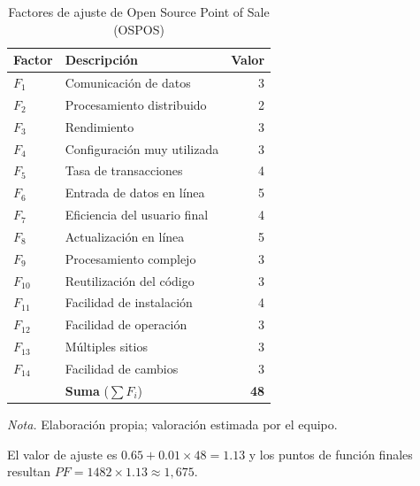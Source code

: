 \begin{table}[H]
\caption{Factores de ajuste de Open Source Point of Sale (OSPOS)}
\label{tab:ref3_fi}
\begin{threeparttable}
\begin{tabular}{>{\raggedright\arraybackslash}p{1.4cm} >{\raggedright\arraybackslash}p{7cm} r}
\toprule
Factor & Descripción & Valor \\
\midrule
$F_{1}$ & Comunicación de datos & 3 \\
$F_{2}$ & Procesamiento distribuido & 2 \\
$F_{3}$ & Rendimiento & 3 \\
$F_{4}$ & Configuración muy utilizada & 3 \\
$F_{5}$ & Tasa de transacciones & 4 \\
$F_{6}$ & Entrada de datos en línea & 5 \\
$F_{7}$ & Eficiencia del usuario final & 4 \\
$F_{8}$ & Actualización en línea & 5 \\
$F_{9}$ & Procesamiento complejo & 3 \\
$F_{10}$ & Reutilización del código & 3 \\
$F_{11}$ & Facilidad de instalación & 4 \\
$F_{12}$ & Facilidad de operación & 3 \\
$F_{13}$ & Múltiples sitios & 3 \\
$F_{14}$ & Facilidad de cambios & 3 \\
 & \textbf{Suma} ($\sum F_i$) & \textbf{48} \\
\bottomrule
\end{tabular}
\begin{tablenotes}
\item \textit{Nota.} Elaboración propia; valoración estimada por el equipo.
\end{tablenotes}
\end{threeparttable}
\end{table}

El valor de ajuste es $0.65 + 0.01 \times 48 = 1.13$ y los puntos de función finales resultan $PF = 1482 \times 1.13 \approx 1,675$.

